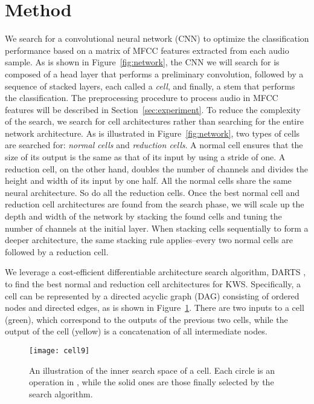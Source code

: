\documentclass[a4paper]{article}
\begin{document}
\section{Method}
We search for a convolutional neural network (CNN) to optimize the classification performance based on a matrix of MFCC features extracted from each audio sample. 
 As is shown in Figure~\ref{fig:network}, the CNN we will search for is composed of a head layer that performs a preliminary  convolution, followed by a sequence of  stacked layers, each called a \textit{cell}, and finally, a stem that performs the classification.  The preprocessing procedure to process audio in MFCC features will be described in Section~\ref{sec:experiment}. 
 To reduce the complexity of the search, we search for cell architectures rather than searching for the entire network architecture.
 As is illustrated in Figure~\ref{fig:network}, two types of cells are searched for: \textit{normal cells} and \textit{reduction cells}. A normal cell ensures that the size of its output is the same as that of its input by using a stride of one. A reduction cell, on the other hand, doubles the number of channels and divides the height and width of its input by one half. All the normal cells share the same neural architecture. So do all the reduction cells. Once the best normal cell and reduction cell architectures are found from the search phase, we will scale up the depth and width of the network by stacking the found cells and tuning the number of channels at the initial layer. When stacking cells sequentially to form a deeper architecture, the same stacking rule applies--every two normal cells are followed by a reduction cell.
 
We leverage a cost-efficient differentiable architecture search algorithm, DARTS \cite{liu2018darts}, to find the best normal and reduction cell architectures for KWS.
Specifically, a cell can be represented by a directed acyclic graph (DAG) consisting of ordered nodes and directed edges, as is shown in Figure~\ref{fig:cell}. There are two inputs to a cell (green), which correspond to the outputs of the previous two cells, while the output of the cell (yellow) is a concatenation of all intermediate nodes. 

\begin{figure}[t]
    \centering
    \texttt{[image: cell9]}
    \vspace{-6.5mm}
    \caption{An illustration of the inner search space of a cell. Each circle is an operation in , while the solid ones are those finally selected by the search algorithm.}
    \label{fig:cell}
\end{figure}
\end{document}
